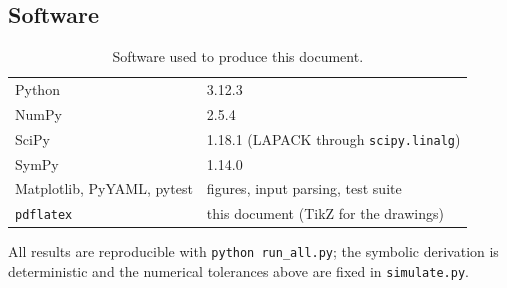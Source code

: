 \documentclass[10pt,a4paper]{article}
\numberwithin{equation}{section}
\begin{document}
\subsection{Software}
\begin{table}[H]\centering\small
\caption{Software used to produce this document.}\label{tab:software}
\begin{tabular}{ll}\toprule
Python & 3.12.3 \\
NumPy & 2.5.4 \\
SciPy & 1.18.1 (LAPACK through \texttt{scipy.linalg}) \\
SymPy & 1.14.0 \\
Matplotlib, PyYAML, pytest & figures, input parsing, test suite \\
\texttt{pdflatex} & this document (TikZ for the drawings) \\ \bottomrule
\end{tabular}\end{table}
All results are reproducible with \texttt{python run\_all.py}; the symbolic derivation is deterministic and the numerical tolerances above are fixed in \texttt{simulate.py}.
\end{document}
